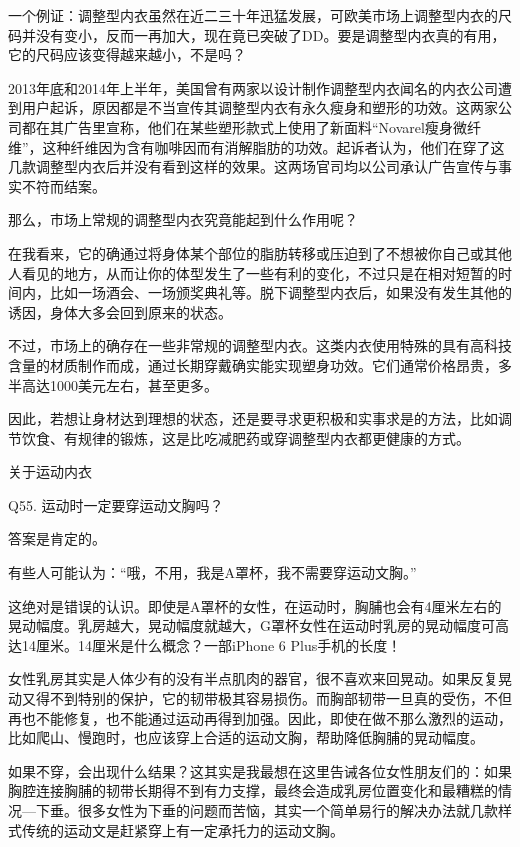 \documentclass[12pt,UTF8]{ctexbook}
\begin{document}
一个例证：调整型内衣虽然在近二三十年迅猛发展，可欧美市场上调整型内衣的尺码并没有变小，反而一再加大，现在竟已突破了DD。要是调整型内衣真的有用，它的尺码应该变得越来越小，不是吗？

2013年底和2014年上半年，美国曾有两家以设计制作调整型内衣闻名的内衣公司遭到用户起诉，原因都是不当宣传其调整型内衣有永久瘦身和塑形的功效。这两家公司都在其广告里宣称，他们在某些塑形款式上使用了新面料“Novarel瘦身微纤维”，这种纤维因为含有咖啡因而有消解脂肪的功效。起诉者认为，他们在穿了这几款调整型内衣后并没有看到这样的效果。这两场官司均以公司承认广告宣传与事实不符而结案。

那么，市场上常规的调整型内衣究竟能起到什么作用呢？

在我看来，它的确通过将身体某个部位的脂肪转移或压迫到了不想被你自己或其他人看见的地方，从而让你的体型发生了一些有利的变化，不过只是在相对短暂的时间内，比如一场酒会、一场颁奖典礼等。脱下调整型内衣后，如果没有发生其他的诱因，身体大多会回到原来的状态。

不过，市场上的确存在一些非常规的调整型内衣。这类内衣使用特殊的具有高科技含量的材质制作而成，通过长期穿戴确实能实现塑身功效。它们通常价格昂贵，多半高达1000美元左右，甚至更多。

因此，若想让身材达到理想的状态，还是要寻求更积极和实事求是的方法，比如调节饮食、有规律的锻炼，这是比吃减肥药或穿调整型内衣都更健康的方式。





关于运动内衣


Q55. 运动时一定要穿运动文胸吗？


答案是肯定的。

有些人可能认为：“哦，不用，我是A罩杯，我不需要穿运动文胸。”

这绝对是错误的认识。即使是A罩杯的女性，在运动时，胸脯也会有4厘米左右的晃动幅度。乳房越大，晃动幅度就越大，G罩杯女性在运动时乳房的晃动幅度可高达14厘米。14厘米是什么概念？一部iPhone 6 Plus手机的长度！

女性乳房其实是人体少有的没有半点肌肉的器官，很不喜欢来回晃动。如果反复晃动又得不到特别的保护，它的韧带极其容易损伤。而胸部韧带一旦真的受伤，不但再也不能修复，也不能通过运动再得到加强。因此，即使在做不那么激烈的运动，比如爬山、慢跑时，也应该穿上合适的运动文胸，帮助降低胸脯的晃动幅度。

如果不穿，会出现什么结果？这其实是我最想在这里告诫各位女性朋友们的：如果胸腔连接胸脯的韧带长期得不到有力支撑，最终会造成乳房位置变化和最糟糕的情况—下垂。很多女性为下垂的问题而苦恼，其实一个简单易行的解决办法就几款样式传统的运动文是赶紧穿上有一定承托力的运动文胸。
\end{document}
